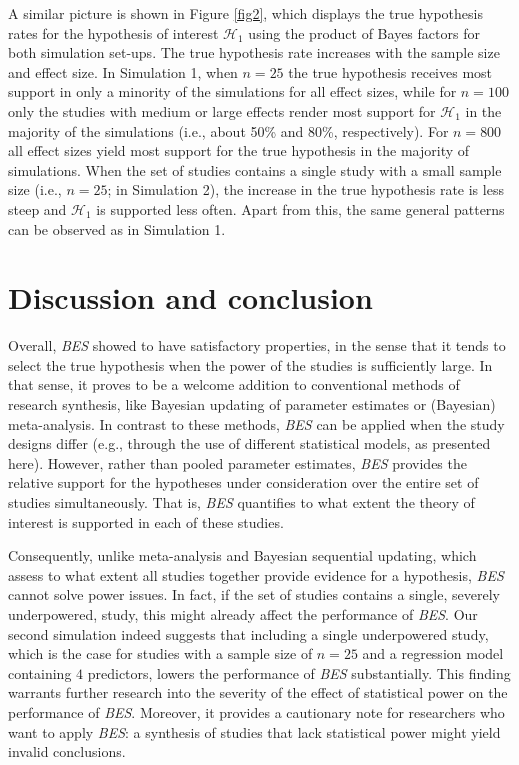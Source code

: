 \documentclass[]{interact}
\theoremstyle{plain}%
\theoremstyle{definition}
\theoremstyle{remark}
\begin{document}
A similar picture is shown in Figure \ref{fig2}, which displays the true
hypothesis rates for the hypothesis of interest \(\mathcal{H}_1\) using
the product of Bayes factors for both simulation set-ups. The true
hypothesis rate increases with the sample size and effect size. In
Simulation 1, when \(n = 25\) the true hypothesis receives most support
in only a minority of the simulations for all effect sizes, while for
\(n = 100\) only the studies with medium or large effects render most
support for \(\mathcal{H}_1\) in the majority of the simulations (i.e.,
about 50\% and 80\%, respectively). For \(n = 800\) all effect sizes
yield most support for the true hypothesis in the majority of
simulations. When the set of studies contains a single study with a
small sample size (i.e., \(n = 25\); in Simulation 2), the increase in
the true hypothesis rate is less steep and \(\mathcal{H}_1\) is
supported less often. Apart from this, the same general patterns can be
observed as in Simulation 1.

\hypertarget{discussion-and-conclusion}{%
\section{Discussion and conclusion}\label{discussion-and-conclusion}}

Overall, \emph{BES} showed to have satisfactory properties, in the sense
that it tends to select the true hypothesis when the power of the
studies is sufficiently large. In that sense, it proves to be a welcome
addition to conventional methods of research synthesis, like Bayesian
updating of parameter estimates or (Bayesian) meta-analysis. In contrast
to these methods, \emph{BES} can be applied when the study designs
differ (e.g., through the use of different statistical models, as
presented here). However, rather than pooled parameter estimates,
\emph{BES} provides the relative support for the hypotheses under
consideration over the entire set of studies simultaneously. That is,
\emph{BES} quantifies to what extent the theory of interest is supported
in each of these studies.

Consequently, unlike meta-analysis and Bayesian sequential updating,
which assess to what extent all studies together provide evidence for a
hypothesis, \emph{BES} cannot solve power issues. In fact, if the set of
studies contains a single, severely underpowered, study, this might
already affect the performance of \emph{BES}. Our second simulation
indeed suggests that including a single underpowered study, which is the
case for studies with a sample size of \(n = 25\) and a regression model
containing \(4\) predictors, lowers the performance of \emph{BES}
substantially. This finding warrants further research into the severity
of the effect of statistical power on the performance of \emph{BES}.
Moreover, it provides a cautionary note for researchers who want to
apply \emph{BES}: a synthesis of studies that lack statistical power
might yield invalid conclusions.
\end{document}

